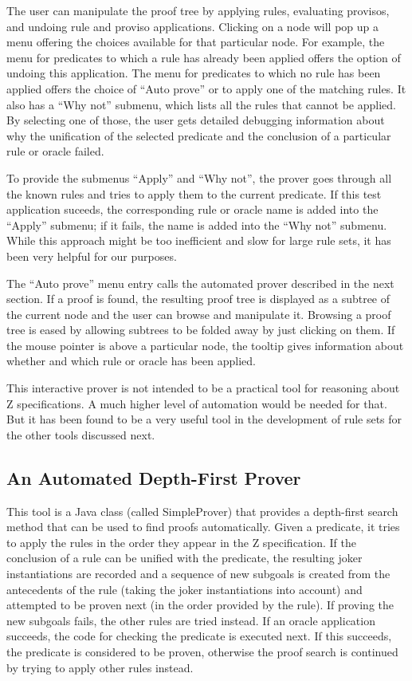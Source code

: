 \documentclass{entcs}
\begin{document}
The user can manipulate the proof tree by applying rules, evaluating
provisos, and undoing rule and proviso applications.  Clicking on a
node will pop up a menu offering the choices available for that
particular node.  For example, the menu for predicates to which a rule
has already been applied offers the option of undoing this
application.  The menu for predicates to which no rule has been
applied offers the choice of ``Auto prove'' or to apply one of the
matching rules.  It also has a ``Why not'' submenu, which lists all
the rules that cannot be applied.  By selecting one of those, the user
gets detailed debugging information about why the unification of the
selected predicate and the conclusion of a particular rule or oracle
failed.

To provide the submenus ``Apply'' and ``Why not'', the prover goes
through all the known rules and tries to apply them to the current
predicate.  If this test application suceeds, the corresponding rule
or oracle name is added into the ``Apply'' submenu; if it fails, the
name is added into the ``Why not'' submenu.  While this approach might
be too inefficient and slow for large rule sets, it has been very
helpful for our purposes.

The ``Auto prove'' menu entry calls the automated prover described in
the next section.  If a proof is found, the resulting proof tree is
displayed as a subtree of the current node and the user can browse and
manipulate it.  Browsing a proof tree is eased by allowing subtrees to
be folded away by just clicking on them.  If the mouse pointer is
above a particular node, the tooltip gives information about whether
and which rule or oracle has been applied.

This interactive prover is not intended to be a practical tool for
reasoning about Z specifications.  A much higher level of automation
would be needed for that.  But it has been found to be a very useful
tool in the development of rule sets for the other tools discussed
next.

\subsection{An Automated Depth-First Prover}

This tool is a Java class (called SimpleProver) that provides a
depth-first search method that can be used to find proofs
automatically.  Given a predicate, it tries to apply the rules in the
order they appear in the Z specification.  If the conclusion of a rule
can be unified with the predicate, the resulting joker instantiations
are recorded and a sequence of new subgoals is created from the
antecedents of the rule (taking the joker instantiations into account)
and attempted to be proven next (in the order provided by the rule).
If proving the new subgoals fails, the other rules are tried instead.
If an oracle application succeeds, the code for checking the predicate
is executed next.  If this succeeds, the predicate is considered to be
proven, otherwise the proof search is continued by trying to apply
other rules instead.
\end{document}
